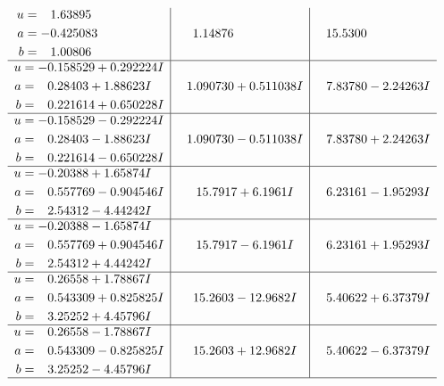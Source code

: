 \documentclass[1p]{elsarticle_modified}
\theoremstyle{definition}
\begin{document}
$$\begin{array}{c|c|c}
\begin{aligned}
u &= \phantom{-}1.63895\phantom{ +0.000000I} \\
a &= -0.425083\phantom{ +0.000000I} \\
b &= \phantom{-}1.00806\phantom{ +0.000000I}\end{aligned}
 & \phantom{-}1.14876\phantom{ +0.000000I} & \phantom{-}15.5300\phantom{ +0.000000I} \\ \hline\begin{aligned}
u &= -0.158529 + 0.292224 I \\
a &= \phantom{-}0.28403 + 1.88623 I \\
b &= \phantom{-}0.221614 + 0.650228 I\end{aligned}
 & \phantom{-}1.090730 + 0.511038 I & \phantom{-}7.83780 - 2.24263 I \\ \hline\begin{aligned}
u &= -0.158529 - 0.292224 I \\
a &= \phantom{-}0.28403 - 1.88623 I \\
b &= \phantom{-}0.221614 - 0.650228 I\end{aligned}
 & \phantom{-}1.090730 - 0.511038 I & \phantom{-}7.83780 + 2.24263 I \\ \hline\begin{aligned}
u &= -0.20388 + 1.65874 I \\
a &= \phantom{-}0.557769 - 0.904546 I \\
b &= \phantom{-}2.54312 - 4.44242 I\end{aligned}
 & \phantom{-}15.7917 + 6.1961 I & \phantom{-}6.23161 - 1.95293 I \\ \hline\begin{aligned}
u &= -0.20388 - 1.65874 I \\
a &= \phantom{-}0.557769 + 0.904546 I \\
b &= \phantom{-}2.54312 + 4.44242 I\end{aligned}
 & \phantom{-}15.7917 - 6.1961 I & \phantom{-}6.23161 + 1.95293 I \\ \hline\begin{aligned}
u &= \phantom{-}0.26558 + 1.78867 I \\
a &= \phantom{-}0.543309 + 0.825825 I \\
b &= \phantom{-}3.25252 + 4.45796 I\end{aligned}
 & \phantom{-}15.2603 - 12.9682 I & \phantom{-}5.40622 + 6.37379 I \\ \hline\begin{aligned}
u &= \phantom{-}0.26558 - 1.78867 I \\
a &= \phantom{-}0.543309 - 0.825825 I \\
b &= \phantom{-}3.25252 - 4.45796 I\end{aligned}
 & \phantom{-}15.2603 + 12.9682 I & \phantom{-}5.40622 - 6.37379 I\\
 \hline 
 \end{array}$$\newpage\newpage\renewcommand{\arraystretch}{1}
\end{document}
